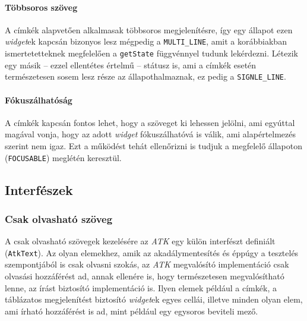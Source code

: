 \paragraph{Többsoros szöveg}

A címkék alapvetően alkalmasak többsoros megjelenítésre, így egy állapot ezen \textit{widget}ek kapcsán bizonyos lesz mégpedig a \texttt{MULTI\_LINE}, amit a korábbiakban ismertetetteknek megfelelően a \texttt{getState} függvénnyel tudunk lekérdezni. Létezik egy másik -- ezzel ellentétes értelmű -- státusz is, ami a címkék esetén természetesen sosem lesz része az állapothalmaznak, ez pedig a \texttt{SIGNLE\_LINE}.

\paragraph{Fókuszálhatóság}

A címkék kapcsán fontos lehet, hogy a szöveget ki lehessen jelölni, ami egyúttal magával vonja, hogy az adott \textit{widget} fókuszálhatóvá is válik, ami alapértelmezés szerint nem igaz. Ezt a működést tehát ellenőrizni is tudjuk a megfelelő állapoton (\texttt{FOCUSABLE}) meglétén keresztül.

\subsection{Interfészek}

\subsubsection{Csak olvasható szöveg}

A csak olvasható szövegek kezelésére az \textit{ATK} egy külön interfészt definiált (\texttt{AtkText}). Az olyan elemekhez, amik az akadálymentesítés és éppúgy a tesztelés szempontjából is csak olvasni szokás, az \textit{ATK} megvalósító implementáció csak olvasási hozzáférést ad, annak ellenére is, hogy természetesen megvalósítható lenne, az írást biztosító implementáció is. Ilyen elemek például a címkék, a táblázatos megjelenítést biztosító \textit{widget}ek egyes cellái, illetve minden olyan elem, ami írható hozzáférést is ad, mint például egy egysoros beviteli mező.

